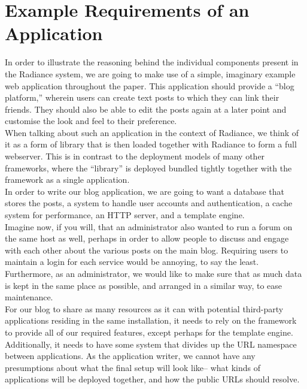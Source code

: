 \documentclass{sig-alternate}
\begin{document}
\section{Example Requirements of an Application}
In order to illustrate the reasoning behind the individual components present in the Radiance system, we are going to make use of a simple, imaginary example web application throughout the paper. This application should provide a ``blog platform,'' wherein users can create text posts to which they can link their friends. They should also be able to edit the posts again at a later point and customise the look and feel to their preference. \\

When talking about such an application in the context of Radiance, we think of it as a form of library that is then loaded together with Radiance to form a full webserver. This is in contrast to the deployment models of many other frameworks, where the ``library'' is deployed bundled tightly together with the framework as a single application. \\

In order to write our blog application, we are going to want a database that stores the posts, a system to handle user accounts and authentication, a cache system for performance, an HTTP server, and a template engine. \\

Imagine now, if you will, that an administrator also wanted to run a forum on the same host as well, perhaps in order to allow people to discuss and engage with each other about the various posts on the main blog. Requiring users to maintain a login for each service would be annoying, to say the least. Furthermore, as an administrator, we would like to make sure that as much data is kept in the same place as possible, and arranged in a similar way, to ease maintenance. \\

For our blog to share as many resources as it can with potential third-party applications residing in the same installation, it needs to rely on the framework to provide all of our required features, except perhaps for the template engine. Additionally, it needs to have some system that divides up the URL namespace between applications. As the application writer, we cannot have any presumptions about what the final setup will look like-- what kinds of applications will be deployed together, and how the public URLs should resolve. \\
\end{document}
